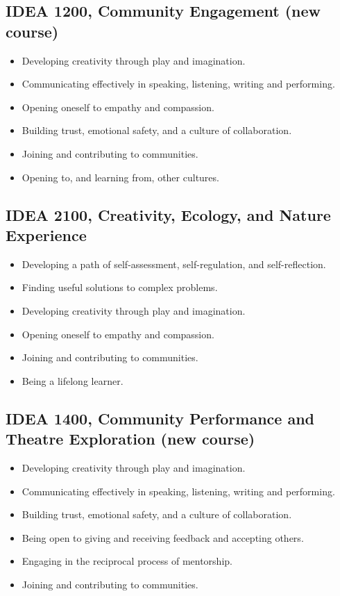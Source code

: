 \documentclass[letterpaper,10pt,headsepline]{scrreprt}
\begin{document}
\subsection{IDEA 1200, Community Engagement (new course)}

\begin{itemize}
\itemsep1pt\parskip0pt
\item
  Developing creativity through play and imagination.
\item
  Communicating effectively in speaking, listening, writing and
  performing.
\item
  Opening oneself to empathy and compassion.
\item
  Building trust, emotional safety, and a culture of collaboration.
\item
  Joining and contributing to communities.
\item
  Opening to, and learning from, other cultures.
\end{itemize}

\subsection{IDEA 2100, Creativity, Ecology, and Nature Experience}

\begin{itemize}
\itemsep1pt\parskip0pt
\item
  Developing a path of self-assessment, self-regulation, and
  self-reflection.
\item
  Finding useful solutions to complex problems.
\item
  Developing creativity through play and imagination.
\item
  Opening oneself to empathy and compassion.
\item
  Joining and contributing to communities.
\item
  Being a lifelong learner.
\end{itemize}

\subsection{IDEA 1400, Community Performance and Theatre Exploration
(new course)}

\begin{itemize}
\itemsep1pt\parskip0pt
\item
  Developing creativity through play and imagination.
\item
  Communicating effectively in speaking, listening, writing and
  performing.
\item
  Building trust, emotional safety, and a culture of collaboration.
\item
  Being open to giving and receiving feedback and accepting others.
\item
  Engaging in the reciprocal process of mentorship.
\item
  Joining and contributing to communities.
\end{itemize}
\end{document}
